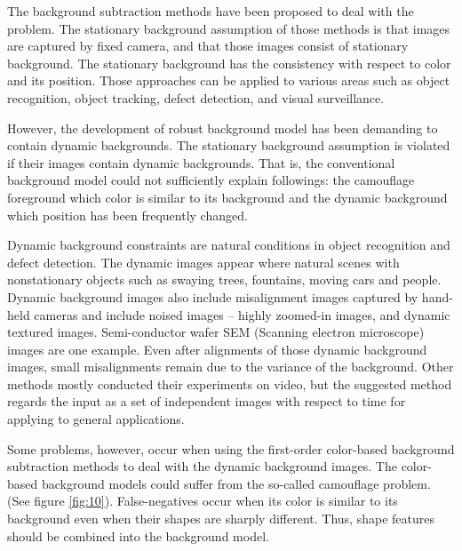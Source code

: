 \documentclass[conference]{IEEEtran}
\begin{document}
  The background subtraction methods have been proposed to deal with the problem. The stationary background assumption of those methods is that images are captured by fixed camera, and that those images consist of stationary background. The stationary background has the consistency with respect to color and its position. Those approaches can be applied to various areas such as object recognition, object tracking, defect detection, and visual surveillance.

  However, the development of robust background model has been demanding to contain dynamic backgrounds. The stationary background assumption is violated if their images contain dynamic backgrounds. That is, the conventional background model could not sufficiently explain followings: the camouflage foreground which color is similar to its background and the dynamic background which position has been frequently changed.
 
  Dynamic background constraints are natural conditions in object recognition and defect detection. The dynamic images appear where natural scenes with nonstationary objects such as swaying trees, fountains, moving cars and people. Dynamic background images also include misalignment images captured by hand-held cameras and include noised images – highly zoomed-in images, and dynamic textured images. Semi-conductor wafer SEM (Scanning electron microscope) images are one example. Even after alignments of those dynamic background images, small misalignments remain due to the variance of the background. Other methods mostly conducted their experiments on video, but the suggested method regards the input as a set of independent images with respect to time for applying to general applications. 
      
Some problems, however, occur when using the first-order color-based background subtraction methods to deal with the dynamic background images. The color-based background models could suffer from the so-called camouflage problem. (See figure \ref{fig:10}). False-negatives occur when its color is similar to its background even when their shapes are sharply different. Thus, shape features should be combined into the background model. 
\end{document}
